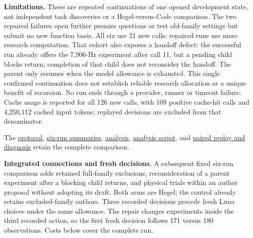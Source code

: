 \documentclass[11pt,a4paper]{article}
\begin{document}
\textbf{Limitations.} These are repeated continuations of one opened development state, not independent task discoveries or a Hegel-versus-Code comparison. The two repaired failures open further premise questions or test old-family settings but submit no new function basis. All six use 21 new calls; repaired runs use more research computation. That cohort also exposes a handoff defect: the successful run already offers the 7,906-Hz experiment after call 11, but a pending child blocks return; completion of that child does not reconsider the handoff. The parent only resumes when the model allowance is exhausted. This single confirmed continuation does not establish reliable research allocation or a unique benefit of recursion. No run ends through a provider, runner or timeout failure. Cache usage is reported for all 126 new calls, with 109 positive cache-hit calls and 4,250,112 cached input tokens; replayed decisions are excluded from that denominator.


The \hyperlink{artifact-119}{protocol}, \hyperlink{artifact-120}{six-run summaries}, \hyperlink{artifact-121}{analysis}, \hyperlink{artifact-122}{analysis script}, and \hyperlink{artifact-123}{paired replay and diagnosis} retain the complete comparison.


\textbf{Integrated connections and fresh decisions.} A subsequent fixed six-run comparison adds retained full-family exclusions, reconsideration of a parent experiment after a blocking child returns, and physical trials within an author proposal without adopting its draft. Both arms are Hegel; the control already retains excluded-family authors. Three recorded decisions precede fresh Luna choices under the same allowance. The repair changes experiments inside the third recorded action, so the first fresh decision follows 171 versus 180 observations. Costs below cover the complete run.
\end{document}
